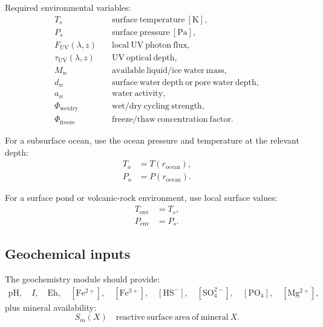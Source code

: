 \documentclass[11pt]{article}
\begin{document}
Required environmental variables:
\begin{align}
    T_s       &\quad \mathrm{surface\ temperature}\ [\mathrm{K}], \\
    P_s       &\quad \mathrm{surface\ pressure}\ [\mathrm{Pa}], \\
    F_{\mathrm{UV}}(\lambda,z)
              &\quad \mathrm{local\ UV\ photon\ flux}, \\
    \tau_{\mathrm{UV}}(\lambda,z)
              &\quad \mathrm{UV\ optical\ depth}, \\
    M_w        &\quad \mathrm{available\ liquid/ice\ water\ mass}, \\
    d_w        &\quad \mathrm{surface\ water\ depth\ or\ pore\ water\ depth}, \\
    a_w        &\quad \mathrm{water\ activity}, \\
    \Phi_{\mathrm{wetdry}}
              &\quad \mathrm{wet/dry\ cycling\ strength}, \\
    \Phi_{\mathrm{freeze}}
              &\quad \mathrm{freeze/thaw\ concentration\ factor}.
\end{align}

For a subsurface ocean, use the ocean pressure and temperature at the relevant
depth:
\begin{align}
    T_o &= T(r_{\mathrm{ocean}}), \\
    P_o &= P(r_{\mathrm{ocean}}).
\end{align}

For a surface pond or volcanic-rock environment, use local surface values:
\begin{align}
    T_{\mathrm{env}} &= T_s, \\
    P_{\mathrm{env}} &= P_s.
\end{align}

\subsection{Geochemical inputs}

The geochemistry module should provide:
\begin{align}
    \mathrm{pH},\quad
    I,\quad
    \mathrm{Eh},\quad
    [\mathrm{Fe^{2+}}],\quad
    [\mathrm{Fe^{3+}}],\quad
    [\mathrm{HS^-}],\quad
    [\mathrm{SO_4^{2-}}],\quad
    [\mathrm{PO_4}],\quad
    [\mathrm{Mg^{2+}}],
\end{align}
plus mineral availability:
\begin{equation}
    S_m(X) \quad \mathrm{reactive\ surface\ area\ of\ mineral\ } X.
\end{equation}
\end{document}
